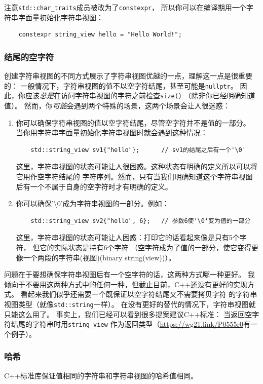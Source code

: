 注意\texttt{std::char\_traits}成员被改为了\texttt{constexpr}，
所以你可以在编译期用一个字符串字面量初始化字符串视图：\label{编译期字符串视图}
\begin{lstlisting}
    constexpr string_view hello = "Hello World!";
\end{lstlisting}

\subsubsection{结尾的空字符}
创建字符串视图的不同方式展示了字符串视图优越的一点，理解这一点是很重要的：
一般情况下，字符串视图的值不以空字符结尾，甚至可能是\texttt{nullptr}。
因此，你应该\emph{总是}在访问字符串视图的字符之前检查\texttt{size()}
（除非你已经明确知道值）。
然而，你\emph{可能}会遇到两个特殊的场景，这两个场景会让人很迷惑：
\begin{enumerate}
    \item 你可以确保字符串视图的值以空字符结尾，尽管空字符并不是值的一部分。
    当你用字符串字面量初始化字符串视图时就会遇到这种情况：
    \begin{lstlisting}
    std::string_view sv1{"hello"};      // sv1的结尾之后有一个'\0'
    \end{lstlisting}
    这里，字符串视图的状态可能让人很困惑。这种状态有明确的定义所以可以将它用作空字符结尾的
    字符序列。然而，只有当我们明确知道这个字符串视图后有一个不属于自身的空字符时才有明确的定义。
    \item 你可以确保'\textbackslash 0'成为字符串视图的一部分。例如：
    \begin{lstlisting}
    std::string_view sv2{"hello", 6};   // 参数6使'\0'变为值的一部分
    \end{lstlisting}
    这里，字符串视图的状态可能让人困惑：打印它的话看起来像是只有5个字符，
    但它的实际状态是持有6个字符
    （空字符成为了值的一部分，使它变得更像一个两段的字符串(视图)(binary string(view))）。
\end{enumerate}
问题在于要想确保字符串视图后有一个空字符的话，这两种方式哪一种更好。
我倾向于不要用这两种方式中的任何一种，但截止目前，C++还没有更好的实现方式。
看起来我们似乎还需要一个既保证以空字符结尾又不需要拷贝字符
的字符串视图类型（就像\texttt{std::string}一样）。
在没有更好的替代的情况下，字符串视图就只能这么用了。
事实上，我们已经可以看到很多提案建议C++标准：
当返回空字符结尾的字符串时用\texttt{string\_view}
作为返回类型（\url{https://wg21.link/P0555r0}有一个例子）。

\subsubsection{哈希}
C++标准库保证值相同的字符串和字符串视图的哈希值相同。


